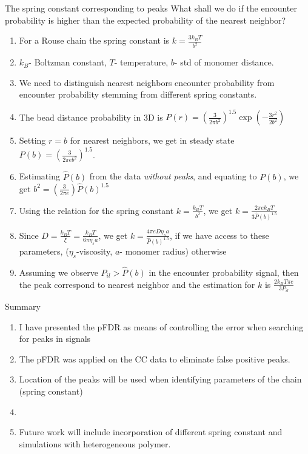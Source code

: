 \documentclass[8pt]{beamer}
\begin{document}
\begin{frame}{The spring constant corresponding to peaks}
What shall we do if the encounter probability is higher than the expected probability of the nearest neighbor?
\begin{enumerate}
\item For a Rouse chain the spring constant is $k=\frac{3k_BT}{b^2}$
\item $k_B$- Boltzman constant, $T$- temperature, $b$- std of monomer distance. 
\item We need to distinguish nearest neighbors encounter probability from encounter probability stemming from different spring constants.
\item The bead distance probability in 3D is $P(r)=\left(\frac{3}{2\pi b^2}\right)^{1.5}\exp\left(-\frac{3r^2}{2b^2} \right)$
\item Setting $r=b$ for nearest neighbors, we get in steady state $P(b)=\left(\frac{3}{2\pi e b^2}\right)^{1.5}$.
\item Estimating $\hat{P}(b)$ from the data \textit{without peaks}, and equating to $P(b)$, we get $ b^2 = \left(\frac{3}{2\pi e}\right)\hat{P}(b)^{1.5}$
\item Using the relation for the spring constant $k=\frac{k_BT}{b^2}$, we get $k=\frac{2\pi e k_BT}{3\hat{P}(b)^{1.5}}$
\item Since $D=\frac{k_BT}{\xi}=\frac{k_BT}{6\pi\eta_s a}$, we get $k=\frac{4\pi eD \eta_s a}{\hat{P}(b)^{1.5}}$, if we have access to these parameters, ($\eta_s$-viscosity, $a$- monomer radius) otherwise
\item Assuming we observe $P_{il}>\hat{P}(b)$ in the encounter probability signal, then the peak correspond to nearest neighbor and the estimation for $k$ is $ \frac{2k_BT\pi e}{3P_{il}}$
\end{enumerate}
\end{frame}

\begin{frame}{Summary}
\begin{enumerate}
\item I have presented the pFDR as means of controlling the error when searching for peaks in signals
\item The pFDR was applied on the CC data to eliminate false positive peaks. 
\item Location of the peaks will be used when identifying parameters of the chain (spring constant)
\item 
\item Future work will include incorporation of different spring constant and simulations with heterogeneous polymer.  
\end{enumerate}
\end{frame}
\end{document}
